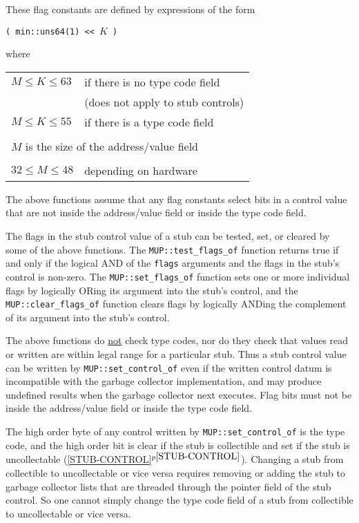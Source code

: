 \documentclass[12pt]{article}
\newcommand{\itemref}[1]{\ref{#1}$^{p\pageref{#1}}$}
\begin{document}
These flag constants are defined by expressions of the form

\begin{center}
\verb|( min::uns64(1) << |$K$\verb| )|
\end{center}

where

\begin{center}
\begin{tabular}{l@{~~~~~}l}
$M\leq K\leq 63$ & if there is no type code field \\
		 & (does not apply to stub controls) \\
$M\leq K\leq 55$ & if there is a type code field \\
\\
\multicolumn{2}{l}{$M$ is the size of the address/value field} \\
\\
$32\leq M\leq 48$ & depending on hardware \\
\end{tabular}
\end{center}

The above functions assume that any flag constants select bits
in a control value that are not inside the address/value field
or inside the type code field.

The flags in the stub control value of a stub can be tested, set, or
cleared by some of the above functions.
The \verb|MUP::test_flags_of| function
returns true if and only if the logical AND of the \verb|flags| arguments
and the flags in the stub's control is non-zero.  The \verb|MUP::set_flags_of|
function sets one or more individual flags by logically ORing its
argument into the stub's control, and the
\verb|MUP::clear_flags_of| function clears flags by logically ANDing
the complement of its argument into the stub's control.

The above functions do \underline{not} check type codes, nor do they check
that values read or written are within legal range for a particular
stub.  Thus a stub control value
can be written by \verb|MUP::set_control_of| even if the written
control datum is incompatible with the garbage collector implementation,
and may produce undefined results when the garbage collector
next executes.  Flag bits must not be inside the address/value field
or inside the type code field.

The high order byte of any control written by \verb|MUP::set_control_of|
is the type code, and the high order bit is clear if the stub is collectible
and set if the stub is uncollectable (\itemref{STUB-CONTROL}).
Changing a stub from collectible to uncollectable or vice versa requires
removing or adding the stub to garbage collector lists that are threaded
through the pointer field of the stub control.  So one cannot simply
change the type code field of a stub from collectible to uncollectable
or vice versa.
\end{document}

